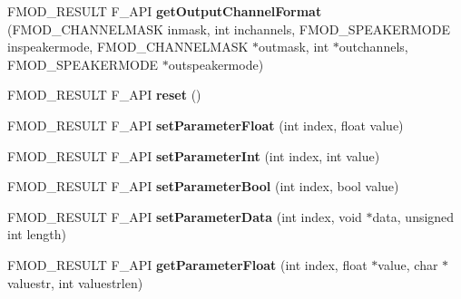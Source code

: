 \begin{DoxyCompactItemize}
\item 
\hypertarget{class_f_m_o_d_1_1_d_s_p_a51940a26a921a03694ace53f63a92e22}{F\+M\+O\+D\+\_\+\+R\+E\+S\+U\+L\+T F\+\_\+\+A\+P\+I {\bfseries get\+Output\+Channel\+Format} (F\+M\+O\+D\+\_\+\+C\+H\+A\+N\+N\+E\+L\+M\+A\+S\+K inmask, int inchannels, F\+M\+O\+D\+\_\+\+S\+P\+E\+A\+K\+E\+R\+M\+O\+D\+E inspeakermode, F\+M\+O\+D\+\_\+\+C\+H\+A\+N\+N\+E\+L\+M\+A\+S\+K $\ast$outmask, int $\ast$outchannels, F\+M\+O\+D\+\_\+\+S\+P\+E\+A\+K\+E\+R\+M\+O\+D\+E $\ast$outspeakermode)}\label{class_f_m_o_d_1_1_d_s_p_a51940a26a921a03694ace53f63a92e22}

\item 
\hypertarget{class_f_m_o_d_1_1_d_s_p_ae475150cbc68d5ad5e5be5791ec3961a}{F\+M\+O\+D\+\_\+\+R\+E\+S\+U\+L\+T F\+\_\+\+A\+P\+I {\bfseries reset} ()}\label{class_f_m_o_d_1_1_d_s_p_ae475150cbc68d5ad5e5be5791ec3961a}

\item 
\hypertarget{class_f_m_o_d_1_1_d_s_p_a19bab08a4e41005148f14c1db2040f72}{F\+M\+O\+D\+\_\+\+R\+E\+S\+U\+L\+T F\+\_\+\+A\+P\+I {\bfseries set\+Parameter\+Float} (int index, float value)}\label{class_f_m_o_d_1_1_d_s_p_a19bab08a4e41005148f14c1db2040f72}

\item 
\hypertarget{class_f_m_o_d_1_1_d_s_p_a25fb620fbbca3f4749f891033459f99e}{F\+M\+O\+D\+\_\+\+R\+E\+S\+U\+L\+T F\+\_\+\+A\+P\+I {\bfseries set\+Parameter\+Int} (int index, int value)}\label{class_f_m_o_d_1_1_d_s_p_a25fb620fbbca3f4749f891033459f99e}

\item 
\hypertarget{class_f_m_o_d_1_1_d_s_p_aed896ed8f8d3998ce2fcdec70638a135}{F\+M\+O\+D\+\_\+\+R\+E\+S\+U\+L\+T F\+\_\+\+A\+P\+I {\bfseries set\+Parameter\+Bool} (int index, bool value)}\label{class_f_m_o_d_1_1_d_s_p_aed896ed8f8d3998ce2fcdec70638a135}

\item 
\hypertarget{class_f_m_o_d_1_1_d_s_p_a9faf74d474b3c55f149830745e03d6a7}{F\+M\+O\+D\+\_\+\+R\+E\+S\+U\+L\+T F\+\_\+\+A\+P\+I {\bfseries set\+Parameter\+Data} (int index, void $\ast$data, unsigned int length)}\label{class_f_m_o_d_1_1_d_s_p_a9faf74d474b3c55f149830745e03d6a7}

\item 
\hypertarget{class_f_m_o_d_1_1_d_s_p_a9c39fc71ec08a47344defe07594ccb80}{F\+M\+O\+D\+\_\+\+R\+E\+S\+U\+L\+T F\+\_\+\+A\+P\+I {\bfseries get\+Parameter\+Float} (int index, float $\ast$value, char $\ast$valuestr, int valuestrlen)}\label{class_f_m_o_d_1_1_d_s_p_a9c39fc71ec08a47344defe07594ccb80}


\end{DoxyCompactItemize}
